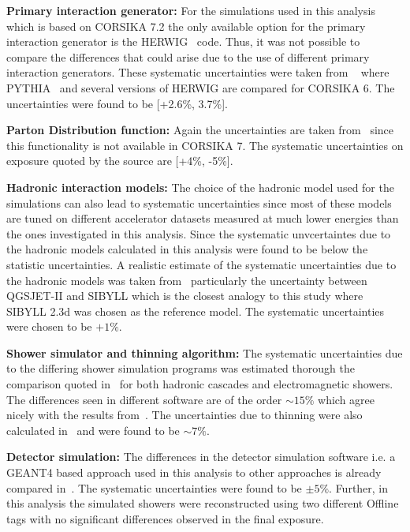 \begin{description}
  \item \textbf{Primary interaction generator:} For the simulations used in this analysis which is based on CORSIKA 7.2 the only available option for the primary interaction generator is the HERWIG~\cite{Corcella:2000bw} code. Thus, it was not possible to compare the differences that could arise due to the use of different primary interaction generators. These systematic uncertainties were taken from ~\cite{gap_systematics} where PYTHIA~\cite{Sjostrand:2006za} and several versions of HERWIG are compared for CORSIKA 6. The uncertainties were found to be [+2.6\%, 3.7\%]. 
  \item \textbf{Parton Distribution function:} Again the uncertainties are taken from~\cite{gap_systematics} since this functionality is not available in CORSIKA 7. The systematic uncertainties on exposure quoted by the source are [+4\%, -5\%].
  \item \textbf{Hadronic interaction models:} The choice of the hadronic model used for the simulations can also lead to systematic uncertainties since most of these models are tuned on different accelerator datasets measured at much lower energies than the ones investigated in this analysis. Since the systematic unvcertaintes due to the hadronic models calculated in this analysis were found to be below the statistic uncertainties. A realistic estimate of the systematic uncertainties due to the hadronic models was taken from~\cite{gap_systematics} particularly the uncertainty between QGSJET-II and SIBYLL which is the closest analogy to this study where SIBYLL 2.3d was chosen as the reference model. The systematic uncertainties were chosen to be $+ 1\%$.
  \item \textbf{Shower simulator and thinning algorithm:} The systematic uncertainties due to the differing shower simulation programs was estimated thorough the comparison quoted in~\cite{Huege:2022xbo} for both hadronic cascades and electromagnetic showers. The differences seen in different software are of the order $\sim 15\%$ which agree nicely with the results from~\cite{gap_systematics}. The uncertainties due to thinning were also calculated in~\cite{gap_systematics} and were found to be $\sim 7\%$.
  \item \textbf{Detector simulation:} The differences in the detector simulation software i.e. a GEANT4 based approach used in this analysis to other approaches is already compared in~\cite{gap_note_det_systematics}. The systematic uncertainties were found to be $\pm 5\%$. Further, in this analysis the simulated showers were reconstructed using two different Offline tags with no significant differences observed in the final exposure. 

\end{description}
